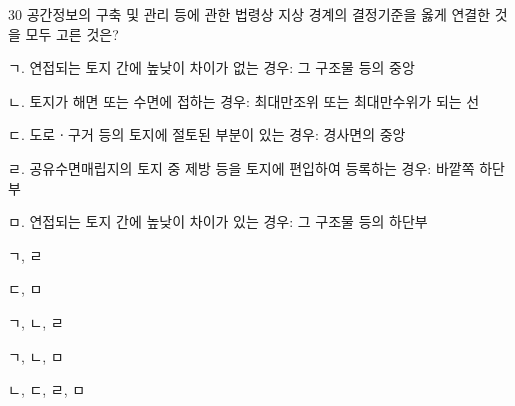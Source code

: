 \begin{question}{30}
공간정보의 구축 및 관리 등에 관한 법령상 지상 경계의 결정기준을 옳게 연결한 것을 모두 고른 것은?
\begin{framedtext}
ㄱ. 연접되는 토지 간에 높낮이 차이가 없는 경우: 그 구조물 등의 중앙 \par
ㄴ. 토지가 해면 또는 수면에 접하는 경우: 최대만조위 또는 최대만수위가 되는 선 \par
ㄷ. 도로ㆍ구거 등의 토지에 절토된 부분이 있는 경우: 경사면의 중앙 \par
ㄹ. 공유수면매립지의 토지 중 제방 등을 토지에 편입하여 등록하는 경우: 바깥쪽 하단부 \par
ㅁ. 연접되는 토지 간에 높낮이 차이가 있는 경우: 그 구조물 등의 하단부 \par
\end{framedtext}
\begin{choices}
  \item ㄱ, ㄹ
  \item ㄷ, ㅁ
  \item ㄱ, ㄴ, ㄹ
  \item ㄱ, ㄴ, ㅁ
  \item ㄴ, ㄷ, ㄹ, ㅁ
\end{choices}
\end{question}
